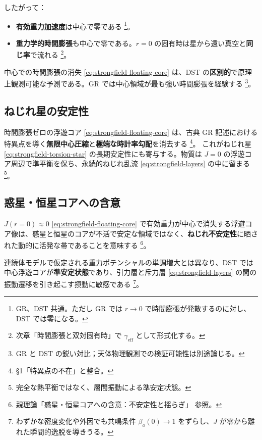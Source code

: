 \documentclass[dvipdfmx,a4paper,oneside]{jsbook}
\numberwithin{equation}{chapter}
\begin{document}
したがって：
\begin{itemize}[leftmargin=2em]
  \item \textbf{有効重力加速度}は中心で零である \footnote{GR、DST 共通。ただし GR では \(r \to 0\) で時間膨張が発散するのに対し、DST では零になる。}。
  \item \textbf{重力学的時間膨張}も中心で零である。\(r = 0\) の固有時は星から遠い真空と\textbf{同じ率}で流れる \footnote{次章「時間膨張と双対固有時」で \(\gamma_{\mathrm{eff}}\) として形式化する。}。
\end{itemize}

中心での時間膨張の消失 \eqref{eq:strongfield-floating-core} は、DST の\textbf{区別的}で原理上観測可能な予測である。GR では中心領域が最も強い時間膨張を経験する \footnote{GR と DST の鋭い対比；天体物理観測での検証可能性は別途論じる。}。

\subsection{ねじれ星の安定性}

時間膨張ゼロの浮遊コア \eqref{eq:strongfield-floating-core} は、古典 GR 記述における特異点を導く\textbf{無限中心圧縮}と\textbf{極端な時計率勾配}を消去する \footnote{§1「特異点の不在」と整合。}。
これがねじれ星 \eqref{eq:strongfield-torsion-star} の長期安定性にも寄与する。物質は \(J = 0\) の浮遊コア周辺で準平衡を保ち、永続的ねじれ乱流 \eqref{eq:strongfield-layers} の中に留まる \footnote{完全な熱平衡ではなく、層間振動による準安定状態。}。

\subsection{惑星・恒星コアへの含意}

\(J(r = 0) \approx 0\) \eqref{eq:strongfield-floating-core} で有効重力が中心で消失する浮遊コア像は、惑星と恒星のコアが不活で安定な領域ではなく、\textbf{ねじれ不安定性}に晒された動的に活発な帯であることを意味する \footnote{\hyperref[sec:sister-manuscripts]{親理論}「惑星・恒星コアへの含意：不安定性と揺らぎ」 参照。}。

連続体モデルで仮定される重力ポテンシャルの単調増大とは異なり、DST では中心浮遊コアが\textbf{準安定状態}であり、引力層と斥力層 \eqref{eq:strongfield-layers} の間の振動遷移を引き起こす摂動に敏感である \footnote{わずかな密度変化や外因でも共鳴条件 \(\beta_a(0) \to 1\) をずらし、\(J\) が零から離れた瞬間的逸脱を導きうる。}。
\end{document}
